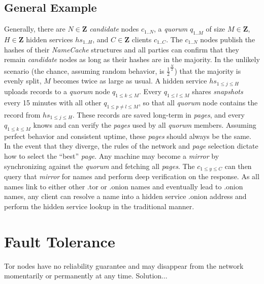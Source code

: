 \subsection{General Example}

Generally, there are $ N \in \textbf{Z} $ \emph{candidate} nodes $ c_{1..N} $, a \emph{quorum} $ q_{1..M} $ of size $ M \in \textbf{Z} $, $ H \in \textbf{Z} $ hidden services $ hs_{1..H} $, and $ C \in \textbf{Z} $ clients $ c_{1..C} $. The $ c_{1..N} $ nodes publish the hashes of their \emph{NameCache} structures and all parties can confirm that they remain \emph{candidate} nodes as long as their hashes are in the majority. In the unlikely scenario (the chance, assuming random behavior, is $ \frac{1}{2} ^ {\frac{N}{2}} $) that the majority is evenly split, $ M $ becomes twice as large as usual. A hidden service $ hs_{1 \le j \le H} $ uploads records to a \emph{quorum} node $ q_{1 \le k \le M} $. Every $ q_{1 \le l \le M} $ shares \emph{snapshots} every 15 minutes with all other $ q_{1 \le p \neq l \le M} $, so that all \emph{quorum} node contains the record from $ hs_{1 \le j \le H} $. These records are saved long-term in \emph{pages}, and every $ q_{1 \le k \le M} $ knows and can verify the \emph{pages} used by all \emph{quorum} members. Assuming perfect behavior and consistent uptime, these \emph{pages} should always be the same. In the event that they diverge, the rules of the network and \emph{page} selection dictate how to select the ``best'' \emph{page}. Any machine may become a \emph{mirror} by synchronizing against the \emph{quorum} and fetching all \emph{pages}. The $ c_{1 \le y \le C} $ can then query that \emph{mirror} for names and perform deep verification on the response. As all names link to either other .tor or .onion names and eventually lead to .onion names, any client can resolve a name into a hidden service .onion address and perform the hidden service lookup in the traditional manner.

\section{Fault Tolerance}

Tor nodes have no reliability guarantee and may disappear from the network momentarily or permanently at any time. Solution...



